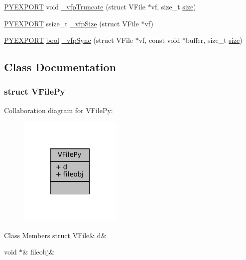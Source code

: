 \begin{DoxyCompactItemize}
\item 
\mbox{\hyperlink{pycommon_8h_a68eebefd6b08dcf3f0bc2b2fe43a32b6}{P\+Y\+E\+X\+P\+O\+RT}} void \mbox{\hyperlink{vfs-py_8h_a5ac15c49208623a9cc85c268badc6347}{\+\_\+vfp\+Truncate}} (struct V\+File $\ast$vf, size\+\_\+t \mbox{\hyperlink{ioapi_8h_a014d89bd76f74ef3a29c8f04b473eb76}{size}})
\item 
\mbox{\hyperlink{pycommon_8h_a68eebefd6b08dcf3f0bc2b2fe43a32b6}{P\+Y\+E\+X\+P\+O\+RT}} ssize\+\_\+t \mbox{\hyperlink{vfs-py_8h_aaeb45e86edebf00351aa966cfd1709ec}{\+\_\+vfp\+Size}} (struct V\+File $\ast$vf)
\item 
\mbox{\hyperlink{pycommon_8h_a68eebefd6b08dcf3f0bc2b2fe43a32b6}{P\+Y\+E\+X\+P\+O\+RT}} \mbox{\hyperlink{libretro_8h_a4a26dcae73fb7e1528214a068aca317e}{bool}} \mbox{\hyperlink{vfs-py_8h_a15e025946bb093e2da2701f6a805f8de}{\+\_\+vfp\+Sync}} (struct V\+File $\ast$vf, const void $\ast$buffer, size\+\_\+t \mbox{\hyperlink{ioapi_8h_a014d89bd76f74ef3a29c8f04b473eb76}{size}})
\end{DoxyCompactItemize}


\subsection{Class Documentation}
\label{struct_v_file_py}
\subsubsection{struct V\+File\+Py}


Collaboration diagram for V\+File\+Py\+:
\nopagebreak
\begin{figure}[H]
\begin{center}
\leavevmode
\includegraphics[width=139pt]{struct_v_file_py__coll__graph}
\end{center}
\end{figure}
\begin{DoxyFields}{Class Members}
\mbox{\label{vfs-py_8h_ae50394e63c9bceb0f3ec323a3fe3a5b5}} 
struct VFile&
d&
\\
\hline

\mbox{\label{vfs-py_8h_a1c524741c4f3452da25e552f53f7033c}} 
void $\ast$&
fileobj&
\\
\hline

\end{DoxyFields}


